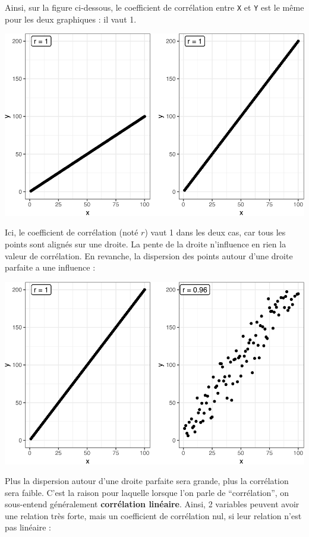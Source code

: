 \documentclass[
  a4paper,
]{article}
\begin{document}
Ainsi, sur la figure ci-dessous, le coefficient de corrélation entre \texttt{X} et \texttt{Y} est le même pour les deux graphiques : il vaut 1.

\begin{center}\includegraphics[width=0.9\linewidth]{figure/unnamed-chunk-96-1} \end{center}

Ici, le coefficient de corrélation (noté \(r\)) vaut 1 dans les deux cas, car tous les points sont alignés sur une droite. La pente de la droite n'influence en rien la valeur de corrélation. En revanche, la dispersion des points autour d'une droite parfaite a une influence :

\begin{center}\includegraphics[width=0.9\linewidth]{figure/unnamed-chunk-97-1} \end{center}

Plus la dispersion autour d'une droite parfaite sera grande, plus la corrélation sera faible. C'est la raison pour laquelle lorsque l'on parle de ``corrélation'', on sous-entend généralement \textbf{corrélation linéaire}. Ainsi, 2 variables peuvent avoir une relation très forte, mais un coefficient de corrélation nul, si leur relation n'est pas linéaire :
\end{document}
